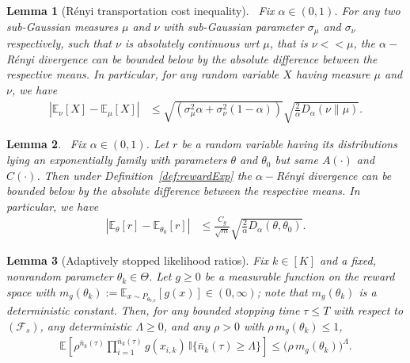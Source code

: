 \documentclass[10pt,a4paper]{amsart}
\newtheorem{lemma}{Lemma}
\def\bbE{\mathbb E}
\def\ind{\mathbb{I}}
\begin{document}
\begin{lemma}[R\'enyi transportation cost inequality]~\label{lem:Pin}
    Fix $\alpha\in (0,1)$. For any two sub-Gaussian measures $\mu$ and $\nu$ with sub-Gaussian parameter $\sigma_{\mu}$ and $\sigma_{\nu}$ respectively, such that $\nu$ is absolutely continuous wrt $\mu$, that is $\nu << \mu$, the $\alpha-$R\'enyi divergence can be bounded below by the absolute difference between the respective means. In particular, for any random variable $X$ having measure $\mu$ and $\nu$, we have  
    \begin{align}
        |\bbE_{\nu}[X]-\bbE_{\mu}[X]  | &\leq \sqrt{(\sigma_{\mu}^2\alpha+\sigma_{\nu}^2(1-\alpha))} \sqrt{\frac{2}{\alpha} D_{\alpha}(\nu\|\mu) }.
        \end{align} 
\end{lemma}

\begin{lemma}~\label{lem:Exp}
    Fix $\alpha\in (0,1)$. Let $r$ be a random variable having its distributions lying an exponentially family with parameters $\theta$ and $\theta_0$ but same $A(\cdot)$ and $C(\cdot)$. Then under Definition~\ref{def:rewardExp} the $\alpha-$R\'enyi divergence can be bounded below by the absolute difference between the respective means. In particular, we have  
    \begin{align}
        |\bbE_{\theta}[r]-\bbE_{\theta_0}[r]  | &\leq \frac{C_g}{\sqrt{m}} \sqrt{\frac{2}{\alpha} D_{\alpha}(\theta,\theta_0) }.
        \end{align} 
\end{lemma}

\begin{lemma}[Adaptively stopped likelihood ratios]\label{lem:MG}
Fix $k \in [K]$ and a \emph{fixed, nonrandom} parameter $\theta_k \in \Theta$. Let $g \geq 0$ be a measurable function on the reward space with $m_g(\theta_k) := \bbE_{x \sim P_{\theta_{0,k}}}[g(x)] \in (0,\infty)$; note that $m_g(\theta_k)$ is a deterministic constant. Then, for any bounded stopping time $\tau \leq T$ with respect to $(\mathcal{F}_s)$, any deterministic $\Lambda \geq 0$, and any $\rho > 0$ with $\rho\, m_g(\theta_k) \leq 1$,
\begin{align}
    \bbE\left[ \rho^{\bar n_k(\tau)} \prod_{i=1}^{\bar n_k(\tau)} g(x_{i,k})\, \ind\{\bar n_k(\tau) \geq \Lambda\} \right] \leq \big(\rho\, m_g(\theta_k)\big)^{\Lambda}.
    \label{eq:MGkey}
\end{align}

\end{lemma}
\end{document}
